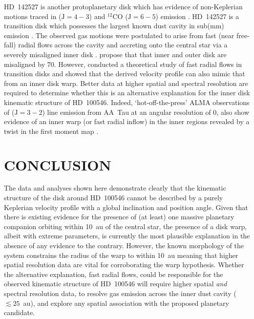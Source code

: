 \documentclass[onecolumn]{aastex6}
\begin{document}
HD~142527 is another protoplanetary disk which has evidence of
non-Keplerian motions traced in 
($\mathrm{J}=4-3$) and $^{12}$CO ($\mathrm{J}=6-5$)
emission \citep{casassus13,casassus15}.
HD~142527 is a transition disk which possesses the largest known
dust cavity in sub(mm) emission
\citep[$\approx 140$~au][]{casassus13,fukagawa13}.
The observed gas motions were postulated to arise from fast
(near free-fall) radial flows across the cavity and
accreting onto the central star via a severely misaligned inner disk
\citep{casassus13,casassus15,marino15}.
\citet{marino15} propose that that inner and outer disk are misaligned
by 70\degree.
However, \citet{rosenfeld14} conducted a theoretical study of
fast radial flows in transition disks and showed that the
derived velocity profile can also mimic that from an inner
disk warp.
Better data at higher spatial and spectral resolution are required
to determine whether this is an alternative explanation for the
inner disk kinematic structure of HD~100546.
Indeed, `hot-off-the-press' ALMA observations of
 ($\mathrm{J}=3-2$) line emission from AA~Tau at an angular resolution of 0, also show evidence
of an inner warp (or fast radial inflow) in the
inner regions revealed by a twist in the first
moment map \citep{loomis17}.

\section{CONCLUSION}
\label{conclusion}

The data and analyses shown here demonstrate clearly that
the kinematic structure of the disk around HD~100546 cannot be
described by a purely Keplerian velocity profile with a global inclination
and position angle.
Given that there is existing evidence for the presence of (at least)
one massive planetary companion orbiting within 10~au of the central
star, the presence of a disk warp, albeit with extreme parameters,
is currently the most plausible explanation
in the absence of any evidence to the contrary.
However, the known morphology of the system constrains the radius of the warp to
within 10~au meaning that higher spatial resolution data
are vital for corroborating the warp hypothesis.
Whether the alternative explanation, fast radial flows, could be responsible for the observed
kinematic structure of HD~100546 will require higher spatial {\em and} spectral
resolution data, to resolve gas emission across the inner dust cavity
($\lesssim 25$~au), and explore any spatial association with the proposed
planetary candidate.
\end{document}
